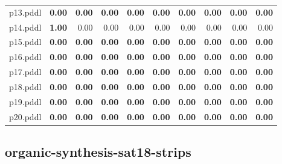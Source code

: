 \documentclass{article}
\begin{document}
\begin{tabular}{@{}lrrrrrrrrr@{}}
p13.pddl & \textbf{0.00} & \textbf{0.00} & \textbf{0.00} & \textbf{0.00} & \textbf{0.00} & \textbf{0.00} & \textbf{0.00} & \textbf{0.00} & \textbf{0.00} \\
p14.pddl & \textbf{1.00} & 0.00 & 0.00 & 0.00 & 0.00 & 0.00 & 0.00 & 0.00 & 0.00 \\
p15.pddl & \textbf{0.00} & \textbf{0.00} & \textbf{0.00} & \textbf{0.00} & \textbf{0.00} & \textbf{0.00} & \textbf{0.00} & \textbf{0.00} & \textbf{0.00} \\
p16.pddl & \textbf{0.00} & \textbf{0.00} & \textbf{0.00} & \textbf{0.00} & \textbf{0.00} & \textbf{0.00} & \textbf{0.00} & \textbf{0.00} & \textbf{0.00} \\
p17.pddl & \textbf{0.00} & \textbf{0.00} & \textbf{0.00} & \textbf{0.00} & \textbf{0.00} & \textbf{0.00} & \textbf{0.00} & \textbf{0.00} & \textbf{0.00} \\
p18.pddl & \textbf{0.00} & \textbf{0.00} & \textbf{0.00} & \textbf{0.00} & \textbf{0.00} & \textbf{0.00} & \textbf{0.00} & \textbf{0.00} & \textbf{0.00} \\
p19.pddl & \textbf{0.00} & \textbf{0.00} & \textbf{0.00} & \textbf{0.00} & \textbf{0.00} & \textbf{0.00} & \textbf{0.00} & \textbf{0.00} & \textbf{0.00} \\
p20.pddl & \textbf{0.00} & \textbf{0.00} & \textbf{0.00} & \textbf{0.00} & \textbf{0.00} & \textbf{0.00} & \textbf{0.00} & \textbf{0.00} & \textbf{0.00} \\
\end{tabular}

\hypertarget{quality-organic-synthesis-sat18-strips}{}
\subsection*{organic-synthesis-sat18-strips}
\end{document}
